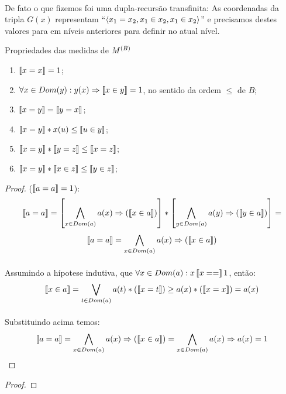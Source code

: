     \paragraph{}
        De fato o que fizemos foi uma dupla-recursão transfinita: As coordenadas da tripla $G(x)$ representam 
        ``$\TUPLE{x_1 = x_2}{x_1 \in x_2}{x_1 \in x_2}$'' e precisamos destes valores para em níveis anteriores 
        para definir no atual nível.
    \begin{proposition}{Propriedades das medidas de $M^{(B)}$}
        \begin{enumerate}
            \item $ \left\llbracket x = x\right\rrbracket = 1$;
            \item $ \forall x\in Dom(y): y(x) \Rightarrow \left\llbracket x \in y\right\rrbracket = 1$, no sentido da ordem $\leq$ de $B$;
            \item $ \left\llbracket x = y\right\rrbracket = \left\llbracket y = x\right\rrbracket$;
            \item $\left\llbracket x = y\right\rrbracket *  x(u)      \leq \left\llbracket u \in y\right\rrbracket$;
            \item $\left\llbracket x = y\right\rrbracket * \left\llbracket y = z\right\rrbracket \leq \left\llbracket x = z\right\rrbracket$;
            \item $\left\llbracket x = y\right\rrbracket * \left\llbracket x \in z\right\rrbracket \leq \left\llbracket y \in z\right\rrbracket$;
        \end{enumerate}
        \begin{proof}

            ($\left\llbracket a = a\right\rrbracket = 1$):
            $$\left\llbracket a = a\right\rrbracket = \left[\bigwedge_{x\in Dom(a)} a(x)\Rightarrow (\left\llbracket x \in a\right\rrbracket)\right]*
                           \left[\bigwedge_{y\in Dom(a)} a(y)\Rightarrow (\left\llbracket y \in a\right\rrbracket)\right] = $$
            $$\left\llbracket a = a\right\rrbracket =       \bigwedge_{x\in Dom(a)} a(x)\Rightarrow (\left\llbracket x \in a\right\rrbracket)$$
            \paragraph{}
                Assumindo a hípotese indutiva, que $\forall x\in Dom(a):x\left\llbracket x = =\right\rrbracket 1$, então:
            $$\left\llbracket x \in a\right\rrbracket =       \bigvee_{  t\in Dom(a)} a(t)*    (\left\llbracket x = t\right\rrbracket) \geq a(x)*(\left\llbracket x = x\right\rrbracket) = a(x)$$
            \paragraph{}
                Substituindo acima temos:
            $$\left\llbracket a = a\right\rrbracket =       \bigwedge_{x\in Dom(a)} a(x)\Rightarrow (\left\llbracket x \in a\right\rrbracket) = \bigwedge_{x\in Dom(a)}a(x)\Rightarrow a(x) = 1$$\eop
        \end{proof}
        \begin{proof}
            

\end{proof}
\end{proposition}
